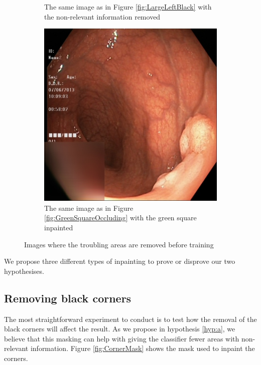 \begin{figure}
\begin{subfigure}[t]{0.4\textwidth}
         \caption{The same image as in Figure \ref{fig:LargeLeftBlack} with the non-relevant information removed}
         \label{fig:LargeLeftBlackFIX}
     \end{subfigure}
     \hfill
     \begin{subfigure}[t]{0.4\textwidth}
         \centering
         \includegraphics[height=\textwidth, width=\textwidth]{experiments/figures/nogreenframe.jpg}
         \caption{The same image as in Figure \ref{fig:GreenSquareOccluding} with the green square inpainted}
         \label{fig:GreenSquareOccludingFIX}
     \end{subfigure}
        \caption{Images where the troubling areas are removed before training}
        \label{fig:KvasirAnomaliesFIX}
\end{figure}


We propose three different types of inpainting to prove or disprove our two hypothesises.
\FloatBarrier
\subsection{Removing black corners}
The most straightforward experiment to conduct is to test how the removal of the black corners will affect the result.
As we propose in hypothesis \ref{hyp:a}, we believe that this masking can help with giving the classifier fewer areas with non-relevant information.
Figure \ref{fig:CornerMask} shows the mask used to inpaint the corners.

